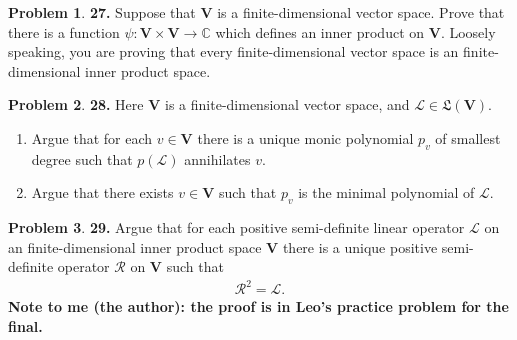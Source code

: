 \documentclass{book}
\theoremstyle{definition}
\newtheorem*{prob*}{Problem}
\newcommand{\V}{\mathbf{V}}
\newcommand{\lag}{\mathcal{L}}
\newcommand{\LL}{\mathfrak{L}}
\begin{document}
\newpage







\begin{prob*}\textbf{27.} Suppose that $\V$ is a finite-dimensional vector space. Prove that there is a function $\psi : \V \times \V \to \mathbb{C}$ which defines an inner product on $\V$. Loosely speaking, you are proving that every finite-dimensional vector space is an finite-dimensional inner product space. 
	
\end{prob*}






\newpage




\begin{prob*}\textbf{28.} Here $\V$ is a finite-dimensional vector space, and $\lag \in \LL(\V)$. 
	\begin{enumerate}
		\item Argue that for each $v\in \V$ there is a unique monic polynomial $p_v$ of smallest degree such that $p(\lag)$ annihilates $v$.
		
		\item Argue that there exists $v\in \V$ such that $p_v$ is the minimal polynomial of $\lag$.
	\end{enumerate}
	
\end{prob*}



\newpage



\begin{prob*}\textbf{29.} Argue that for each positive semi-definite linear operator $\lag$ on an finite-dimensional inner product space $\V$ there is a unique positive semi-definite operator $\mathcal{R}$ on $\V$ such that 
	\begin{align*}
	\mathcal{R}^2 = \lag.
	\end{align*}
	\textbf{Note to me (the author): the proof is in Leo's practice problem for the final.}
	
	
\end{prob*}



\newpage
\end{document}
